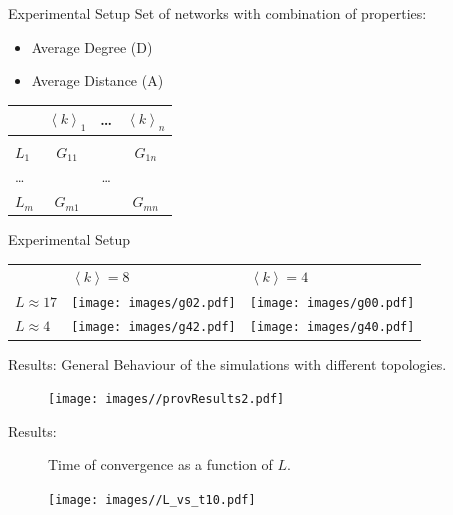\documentclass[12pt, notes=show]{beamer}
\begin{document}
	\begin{frame}{Experimental Setup}
		Set of networks with combination of properties:
		\begin{itemize}
			\item Average Degree (D)
			\item Average Distance (A)
		\end{itemize}
		\begin{center}
			\begin{tabular}{l|ccc}
				& $\left\langle k \right\rangle_1$ & \dots & $\left\langle k \right\rangle_n$\\
				\hline\\
				$L_1$	& $G_{11}$	& 	& $G_{1n}$	\\	
				\dots	&		&\dots	&		\\
				$L_m$	& $G_{m1}$	& 	& $G_{mn}$	\\	
			\end{tabular}
		\end{center}

	\end{frame}
	\begin{frame}{Experimental Setup}
		\begin{table}
			\centering
			\begin{tabular}{m{1.2cm}m{2.5cm}m{2.5cm}}
				&$\left\langle k\right\rangle=8$ & $\left\langle k\right\rangle=4$\\
				$L\approx17$&
				\texttt{[image: images/g02.pdf]}&
				\texttt{[image: images/g00.pdf]}\\
				$L\approx4$&
				\texttt{[image: images/g42.pdf]}&
				\texttt{[image: images/g40.pdf]}\\
			\end{tabular}
		\end{table}
	\end{frame}



	\begin{frame}{Results: }
		General Behaviour of the simulations with different topologies.
		\begin{figure}[h]
			\begin{center}
				\texttt{[image: images//provResults2.pdf]}
			\end{center}
		\end{figure}

	\end{frame}

	\begin{frame}{Results: }
		\begin{figure}[h]

			Time of convergence as a function of $L$.
			\begin{center}
				\texttt{[image: images//L\_vs\_t10.pdf]}

			\end{center}
		\end{figure}

	\end{frame}
\end{document}
